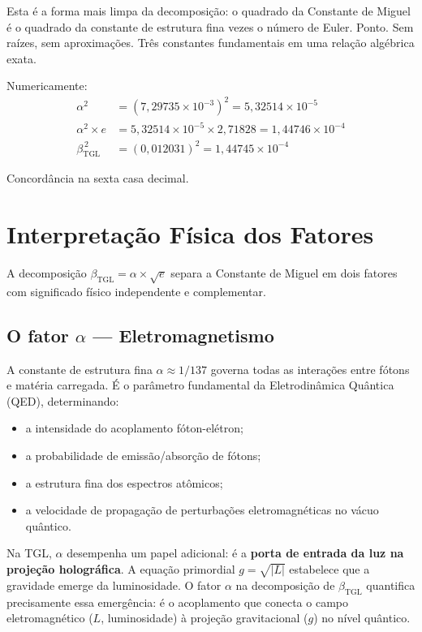 \documentclass[12pt,a4paper,twoside]{article}
\newcommand{\betatgl}{\beta_{\!\scriptscriptstyle\mathrm{TGL}}}
\begin{document}
\noindent Esta é a forma mais limpa da decomposição: o quadrado da Constante de Miguel é o quadrado da constante de estrutura fina vezes o número de Euler. Ponto. Sem raízes, sem aproximações. Três constantes fundamentais em uma relação algébrica exata.

Numericamente:
\begin{align}
\alpha^2 &= (7{,}29735 \times 10^{-3})^2 = 5{,}32514 \times 10^{-5} \\
\alpha^2 \times e &= 5{,}32514 \times 10^{-5} \times 2{,}71828 = 1{,}44746 \times 10^{-4} \\
\betatgl^{\,2} &= (0{,}012031)^2 = 1{,}44745 \times 10^{-4}
\end{align}

Concordância na sexta casa decimal.



\section{Interpretação Física dos Fatores}
\label{sec:fatores}

A decomposição $\betatgl = \alpha \times \sqrt{e}$ separa a Constante de Miguel em dois fatores com significado físico independente e complementar.

\subsection{O fator $\alpha$ --- Eletromagnetismo}

A constante de estrutura fina $\alpha \approx 1/137$ governa todas as interações entre fótons e matéria carregada. É o parâmetro fundamental da Eletrodinâmica Quântica (QED), determinando:

\begin{itemize}[nosep]
\item a intensidade do acoplamento fóton-elétron;
\item a probabilidade de emissão/absorção de fótons;
\item a estrutura fina dos espectros atômicos;
\item a velocidade de propagação de perturbações eletromagnéticas no vácuo quântico.
\end{itemize}

Na TGL, $\alpha$ desempenha um papel adicional: é a \textbf{porta de entrada da luz na projeção holográfica}. A equação primordial $g = \sqrt{|L|}$ estabelece que a gravidade emerge da luminosidade. O fator $\alpha$ na decomposição de $\betatgl$ quantifica precisamente essa emergência: é o acoplamento que conecta o campo eletromagnético ($L$, luminosidade) à projeção gravitacional ($g$) no nível quântico.
\end{document}
